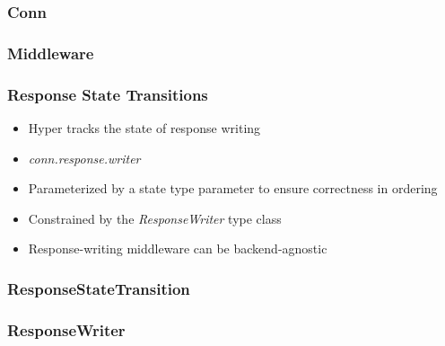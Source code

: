 \begin{frame}
\end{frame}

\begin{frame}
  \frametitle{Conn}
  
\end{frame}


\begin{frame}
  \frametitle{Middleware}
  
\end{frame}

\begin{frame}
  \frametitle{Response State Transitions}
  \begin{itemize}
    \item Hyper tracks the state of response writing
    \item \textit{conn.response.writer}
    \item Parameterized by a state type parameter to ensure correctness in ordering
    \item Constrained by the \textit{ResponseWriter} type class
    \item Response-writing middleware can be backend-agnostic
  \end{itemize}
\end{frame}

\begin{frame}
  \frametitle{ResponseStateTransition}
  
\end{frame}

\begin{frame}[fragile]
  \frametitle{ResponseWriter}
  
\end{frame}

